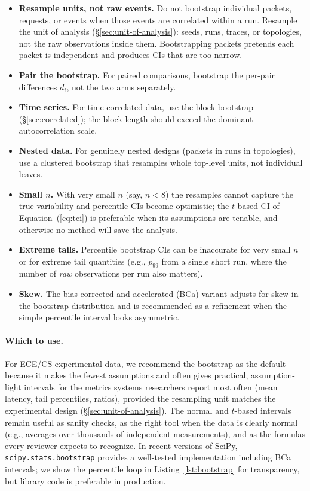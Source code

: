 \documentclass[11pt]{article}
\begin{document}
\begin{itemize}[leftmargin=*, itemsep=1pt]
    \item \textbf{Resample units, not raw events.} Do not bootstrap individual packets, requests, or events when those events are correlated within a run. Resample the unit of analysis (\S\ref{sec:unit-of-analysis}): seeds, runs, traces, or topologies, not the raw observations inside them. Bootstrapping packets pretends each packet is independent and produces CIs that are too narrow.
    \item \textbf{Pair the bootstrap.} For paired comparisons, bootstrap the per-pair differences $d_i$, not the two arms separately.
    \item \textbf{Time series.} For time-correlated data, use the block bootstrap (\S\ref{sec:correlated}); the block length should exceed the dominant autocorrelation scale.
    \item \textbf{Nested data.} For genuinely nested designs (packets in runs in topologies), use a clustered bootstrap that resamples whole top-level units, not individual leaves.
    \item \textbf{Small $n$.} With very small $n$ (say, $n < 8$) the resamples cannot capture the true variability and percentile CIs become optimistic; the $t$-based CI of Equation~(\ref{eq:tci}) is preferable when its assumptions are tenable, and otherwise no method will save the analysis.
    \item \textbf{Extreme tails.} Percentile bootstrap CIs can be inaccurate for very small $n$ or for extreme tail quantities (e.g., $p_{99}$ from a single short run, where the number of \emph{raw} observations per run also matters).
    \item \textbf{Skew.} The bias-corrected and accelerated (BCa) variant adjusts for skew in the bootstrap distribution and is recommended as a refinement when the simple percentile interval looks asymmetric.
\end{itemize}

\paragraph{Which to use.} For ECE/CS experimental data, we recommend the bootstrap as the default because it makes the fewest assumptions and often gives practical, assumption-light intervals for the metrics systems researchers report most often (mean latency, tail percentiles, ratios), provided the resampling unit matches the experimental design (\S\ref{sec:unit-of-analysis}). The normal and $t$-based intervals remain useful as sanity checks, as the right tool when the data is clearly normal (e.g., averages over thousands of independent measurements), and as the formulas every reviewer expects to recognize. In recent versions of SciPy, \texttt{scipy.stats.bootstrap} provides a well-tested implementation including BCa intervals; we show the percentile loop in Listing~\ref{lst:bootstrap} for transparency, but library code is preferable in production.
\end{document}
